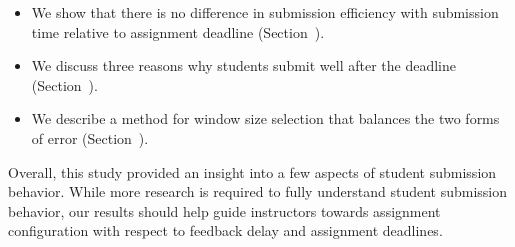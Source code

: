 \begin{itemize}
\item We show that there is no difference in submission efficiency with
  submission time relative to assignment deadline
  (Section~).
\item We discuss three reasons why students submit well after the deadline
  (Section~).
\item We describe a method for window size selection that balances the two
  forms of error (Section~).
\end{itemize}

Overall, this study provided an insight into a few aspects of student
submission behavior. While more research is required to fully understand
student submission behavior, our results should help guide instructors towards
assignment configuration with respect to feedback delay and assignment
deadlines.

